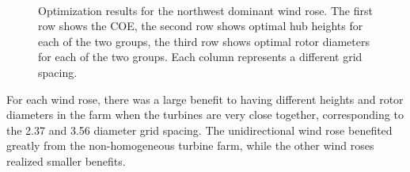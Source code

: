 \documentclass[conf]{new-aiaa}
\begin{document}
\begin{figure}[htbp]
\begin{centering}
    \hspace{-0.35cm}
    \hspace{-0.35cm}
    \hspace{-0.35cm}
    \\
    \vspace{-0.25cm}
    \caption{Optimization results for the northwest dominant wind rose. The first row shows the COE, the second row shows optimal hub heights for each of the two groups, the third row shows optimal rotor diameters for each of the two groups. Each column represents a different grid spacing.}
  \label{northwest}
  \end{centering}
\end{figure}

\newpage
For each wind rose, there was a large benefit to having different heights and rotor diameters in the farm when the turbines are very close together, corresponding to the 2.37 and 3.56 diameter grid spacing. The unidirectional wind rose benefited greatly from the non-homogeneous turbine farm, while the other wind roses realized smaller benefits. 
\end{document}
